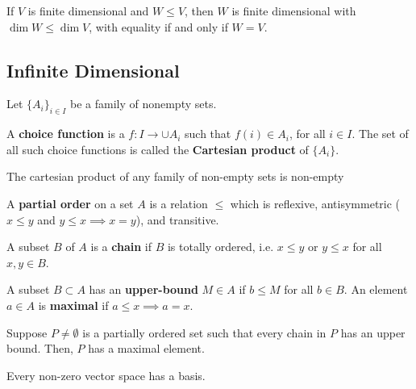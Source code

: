 \begin{cor}
    If $V$ is finite dimensional and $W \leq V$, then $W$ is finite dimensional with $\dim W \leq \dim V$, with equality if and only if $W=V$.
\end{cor}

\subsection{Infinite Dimensional}

Let $\{A_i\}_{i \in I}$ be a family of nonempty sets.

\begin{defn}
    A \textbf{choice function} is a $f:I \to \cup A_i$ such that $f(i) \in A_i$, for all $i \in I$. The set of all such choice functions is called the \textbf{Cartesian product} of $\{A_i\}$.
\end{defn}

\begin{notebox*}
    The cartesian product of any family of non-empty sets is non-empty
\end{notebox*}

\begin{defn}
    A \textbf{partial order} on a set $A$ is a relation $\leq$ which is reflexive, antisymmetric ($x\leq y$ and $y \leq x \implies x=y$), and transitive.
\end{defn}

\begin{defn}
    A subset $B$ of $A$ is a \textbf{chain} if $B$ is totally ordered, i.e. $x\leq y$ or $y \leq x$ for all $x,y \in B$.
\end{defn}

\begin{defn}
    A subset $B \subset A$ has an \textbf{upper-bound} $M \in A$ if $b\leq M$ for all $b \in B$. An element $a \in A$ is \textbf{maximal} if $a \leq x \implies a =x$.
\end{defn}

\begin{lem}
    Suppose $P \neq \emptyset$ is a partially ordered set such that every chain in $P$ has an upper bound. Then, $P$ has a maximal element.
\end{lem}

\begin{thm}
    Every non-zero vector space has a basis.
\end{thm}

